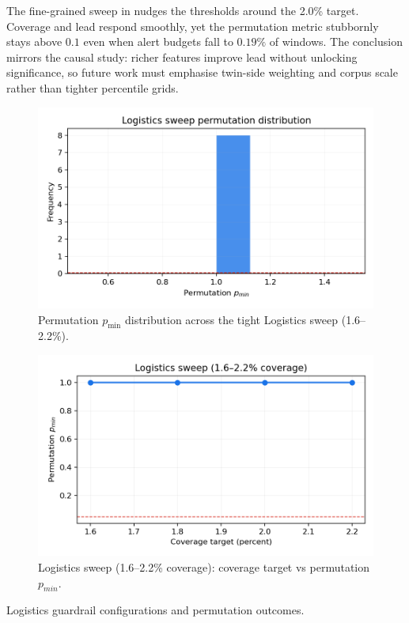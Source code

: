 \documentclass[11pt]{article}
\begin{document}
The fine-grained sweep in
 nudges the thresholds
around the 2.0\% target. Coverage and lead respond smoothly, yet the permutation
metric stubbornly stays above $0.1$ even when alert budgets fall to $0.19\%$ of
windows. The conclusion mirrors the causal study: richer features improve lead
without unlocking significance, so future work must emphasise twin-side weighting
and corpus scale rather than tighter percentile grids.

\begin{figure}[h]
  \centering
  \includegraphics[width=0.72\linewidth]{../figures/fig1b_logistics_perm_distribution.png}
  \caption{Permutation $p_{\min}$ distribution across the tight Logistics sweep (1.6--2.2\%).}
  \label{fig:logistics-perm-dist}
\end{figure}

\begin{figure}[h]
  \centering
  \includegraphics[width=0.72\linewidth]{../figures/fig1_logistics_sweep.png}
  \caption{Logistics sweep (1.6--2.2\% coverage): coverage target vs permutation $p_{min}$.}
  \label{fig:logistics-sweep}
\end{figure}

\begin{table}[h]
  \centering
  \caption{Logistics guardrail configurations and permutation outcomes.}
  \label{tab:stm-guardrail}
  
\end{table}
\end{document}
